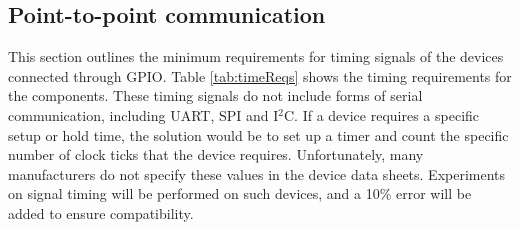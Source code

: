   
  
\subsection{Point-to-point communication}
This section outlines the minimum requirements for timing signals of the devices connected through GPIO. Table \ref{tab:timeReqs} shows the timing requirements for the components. These timing signals do not include forms of serial communication, including UART, SPI and I$^2$C. If a device requires a specific setup or hold time, the solution would be to set up a timer and count the specific number of clock ticks that the device requires. Unfortunately, many manufacturers do not specify these values in the device data sheets. Experiments on signal timing will be performed on such devices, and a 10\% error will be added to ensure compatibility.

